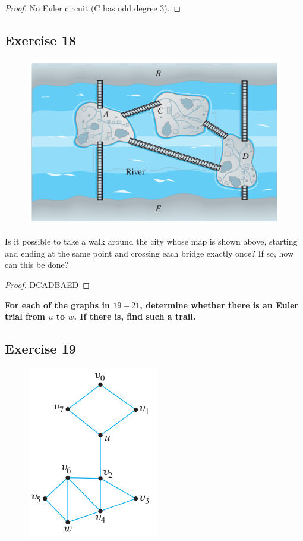 \documentclass[14pt]{extarticle}
\newcommand{\cy}{\color{cyan}}
\begin{document}
\begin{proof}
No Euler circuit (C has odd degree 3).
\end{proof}

\subsection{Exercise 18}
\begin{figure}[ht!]
\centering
\includegraphics[scale=0.5]{../images/10.1.18.png}
\end{figure}

Is it possible to take a walk around the city whose map is shown above, starting and ending at the same point and 
crossing each bridge exactly once? If so, how can this be done?

\begin{proof}
DCADBAED
\end{proof}

{\bf \cy For each of the graphs in \(19-21\), determine whether there is an Euler trial from \(u\) to \(w\). If there 
is, find such a trail.}

\subsection{Exercise 19}
\begin{figure}[ht!]
\centering
\includegraphics[scale=0.4]{../images/10.1.19.png}
\end{figure}
\end{document}
